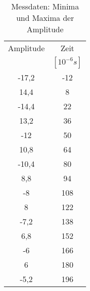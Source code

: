\begin{table}[h!]
  \centering
  \caption{Messdaten: Minima und Maxima der Amplitude}
  \label{tab:amp}
  \begin{tabular}{c c}
    \toprule
Amplitude & Zeit\\
[V] & $[10^{-6}s]$\\
    \midrule
    -17,2	& -12 \\
    14,4	& 8  \\
    -14,4	& 22  \\
    13,2	& 36 \\
    -12	  & 50  \\
    10,8	& 64 \\
    -10,4	& 80  \\
    8,8	  & 94  \\
    -8	  & 108  \\
    8	    & 122 \\
    -7,2	& 138  \\
    6,8 	& 152  \\
    -6	  & 166  \\
    6   	& 180  \\
    -5,2	& 196  \\




    \bottomrule
  \end{tabular}
\end{table}
